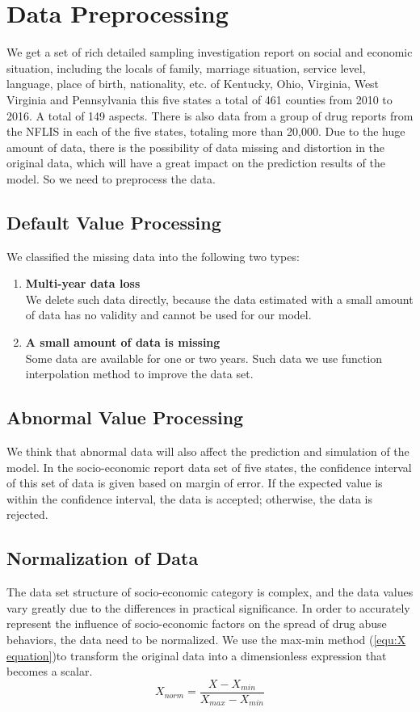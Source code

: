 \documentclass{mcmthesis}
\begin{document}
\section{Data Preprocessing}
We get a set of rich detailed sampling investigation report on social and economic situation, including the locals of family, marriage situation, service level, language, place of birth, nationality, etc. of Kentucky, Ohio, Virginia, West Virginia and Pennsylvania this five states a total of 461 counties from 2010 to 2016. A total of 149 aspects. There is also data from a group of drug reports from the NFLIS in each of the five states, totaling more than 20,000. Due to the huge amount of data, there is the possibility of data missing and distortion in the original data, which will have a great impact on the prediction results of the model. So we need to preprocess the data.\par

\subsection{Default Value Processing}
We classified the missing data into the following two types:
\begin{enumerate}[label=\Alph*.]
\item \textbf{Multi-year data loss} \\
 We delete such data directly, because the data estimated with a small amount of data has no validity and cannot be used for our model.
\item \textbf{A small amount of data is missing}\\
 Some data are available for one or two years. Such data we use function interpolation method to improve the data set.
\end{enumerate}

\subsection{Abnormal Value Processing}
We think that abnormal data will also affect the prediction and simulation of the model. In the socio-economic report data set of five states, the confidence interval of this set of data is given based on margin of error. If the expected value is within the confidence interval, the data is accepted; otherwise, the data is rejected.


\subsection{Normalization of Data}
The data set structure of socio-economic category is complex, and the data values vary greatly due to the differences in practical significance. In order to accurately represent the influence of socio-economic factors on the spread of drug abuse behaviors, the data need to be normalized. We use the max-min method (\ref{equ:X equation})to transform the original data into a dimensionless expression that becomes a scalar. 
  \begin{equation}  \label{equ:X equation}
X_{norm} = \frac{X- X_{min}}{X_{max}-X_{min}}  
  \end{equation}
\end{document}
